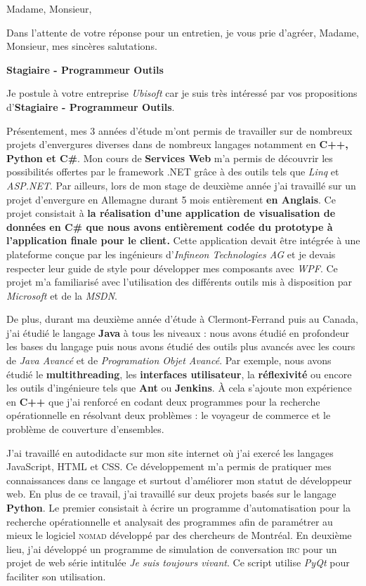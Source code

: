 \date{\today}
\opening{Madame, Monsieur,}
\closing{Dans l'attente de votre réponse pour un entretien, je vous prie d'agréer, Madame, Monsieur, mes sincères salutations.}

\makelettertitle

\textbf{Stagiaire - Programmeur Outils}

\introduction{}
Je postule à votre entreprise \textit{Ubisoft} car je suis très intéressé par vos propositions d'\textbf{Stagiaire - Programmeur Outils}.

Présentement, mes 3 années d'étude m'ont permis de travailler sur de nombreux projets d'envergures diverses dans de nombreux langages notamment en \textbf{C++, Python et C\#}. Mon cours de \textbf{Services Web} m'a permis de découvrir les possibilités offertes par le framework .NET grâce à des outils tels que \textit{Linq} et \textit{ASP.NET}. Par ailleurs, lors de mon stage de deuxième année j'ai travaillé sur un projet d'envergure en Allemagne durant 5 mois entièrement \textbf{en Anglais}. Ce projet consistait à \textbf{la réalisation d'une application de visualisation de données en C\# que nous avons entièrement codée du prototype à l'application finale pour le client.} Cette application devait être intégrée à une plateforme conçue par les ingénieurs d'\textit{Infineon Technologies AG} et je devais respecter leur guide de style pour développer mes composants avec \textit{WPF}. Ce projet m'a familiarisé avec l'utilisation des différents outils mis à disposition par \textit{Microsoft} et de la \textit{MSDN}.

De plus, durant ma deuxième année d'étude à Clermont-Ferrand puis au Canada, j'ai étudié le langage \textbf{Java} à tous les niveaux : nous avons étudié en profondeur les bases du langage puis nous avons étudié des outils plus avancés avec les cours de \textit{Java Avancé} et de \textit{Programation Objet Avancé}. Par exemple, nous avons étudié le \textbf{multithreading}, les \textbf{interfaces utilisateur}, la \textbf{réflexivité} ou encore les outils d'ingénieure tels que \textbf{Ant} ou \textbf{Jenkins}. À cela s'ajoute mon expérience en \textbf{C++} que j'ai renforcé en codant deux programmes pour la recherche opérationnelle en résolvant deux problèmes : le voyageur de commerce et le problème de couverture d'ensembles.

J'ai travaillé en autodidacte sur mon site internet où j'ai exercé les langages JavaScript, HTML et CSS. Ce développement m'a permis de pratiquer mes connaissances dans ce langage et surtout d'améliorer mon statut de développeur web. En plus de ce travail, j'ai travaillé sur deux projets basés sur le langage \textbf{Python}. Le premier consistait à écrire un programme d'automatisation pour la recherche opérationnelle et analysait des programmes afin de paramétrer au mieux le logiciel \textsc{nomad} développé par des chercheurs de Montréal. En deuxième lieu, j'ai développé un programme de simulation de conversation \textsc{irc} pour un projet de web série intitulée \textit{Je suis toujours vivant}. Ce script utilise \textit{PyQt} pour faciliter son utilisation. \conclusion{}

\makeletterclosing
